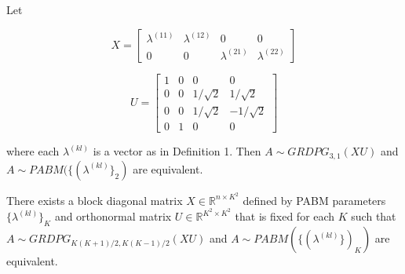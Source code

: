 \documentclass[
  12pt,
]{article}
\begin{document}
\begin{theorem}[Connecting the PABM to the GRDPG for $K = 2$]
\label{theorem1}  
Let 

$$X = \begin{bmatrix} 
\lambda^{(11)} & \lambda^{(12)} & 0 & 0 \\ 
0 & 0 & \lambda^{(21)} & \lambda^{(22)} 
\end{bmatrix}$$

$$U = \begin{bmatrix} 1 & 0 & 0 & 0 \\
0 & 0 & 1 / \sqrt{2} & 1 / \sqrt{2} \\
0 & 0 & 1 / \sqrt{2} & - 1 / \sqrt{2} \\
0 & 1 & 0 & 0 \end{bmatrix}$$

where each $\lambda^{(kl)}$ is a vector as in Definition 1. 
Then $A \sim GRDPG_{3, 1}(X U)$ and $A \sim PABM(\{(\lambda^{(kl)}\}_2)$ are 
equivalent.
\end{theorem}

\begin{theorem}[Generalization to $K > 2$] 
\label{theorem2}
There exists a block diagonal matrix 
$X \in \mathbb{R}^{n \times K^2}$ defined by PABM parameters 
$\{\lambda^{(kl)}\}_K$ and orthonormal matrix 
$U \in \mathbb{R}^{K^2 \times K^2}$ that is fixed 
for each $K$ such that $A \sim GRDPG_{K (K+1) / 2, K (K-1) / 2}(XU)$ and 
$A \sim PABM(\{(\lambda^{(kl)}\})_K)$ are equivalent.
\end{theorem}
\end{document}
